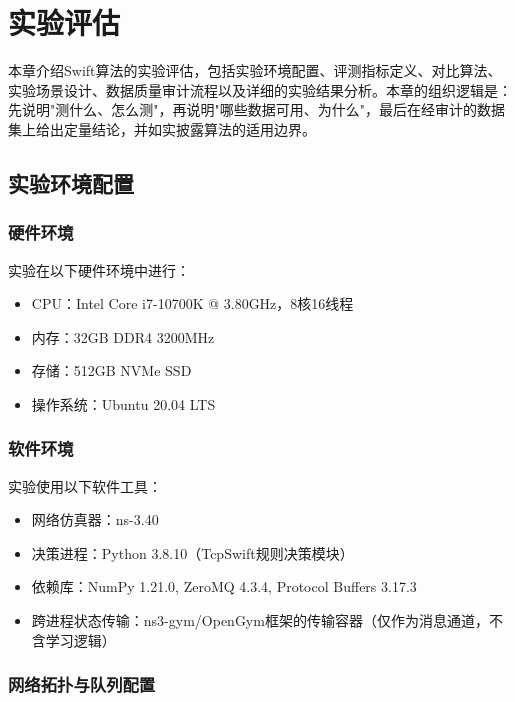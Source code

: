 \chapter{实验评估}\label{Chap:chap4}

本章介绍Swift算法的实验评估，包括实验环境配置、评测指标定义、对比算法、实验场景设计、数据质量审计流程以及详细的实验结果分析。本章的组织逻辑是：先说明"测什么、怎么测"，再说明"哪些数据可用、为什么"，最后在经审计的数据集上给出定量结论，并如实披露算法的适用边界。

\section{实验环境配置}

\subsection{硬件环境}

实验在以下硬件环境中进行：

\begin{itemize}
    \item CPU：Intel Core i7-10700K @ 3.80GHz，8核16线程
    \item 内存：32GB DDR4 3200MHz
    \item 存储：512GB NVMe SSD
    \item 操作系统：Ubuntu 20.04 LTS
\end{itemize}

\subsection{软件环境}

实验使用以下软件工具：

\begin{itemize}
    \item 网络仿真器：ns-3.40
    \item 决策进程：Python 3.8.10（TcpSwift规则决策模块）
    \item 依赖库：NumPy 1.21.0, ZeroMQ 4.3.4, Protocol Buffers 3.17.3
    \item 跨进程状态传输：ns3-gym/OpenGym框架的传输容器（仅作为消息通道，不含学习逻辑）
\end{itemize}

\subsection{网络拓扑与队列配置}
\label{sec:queue-ecn-caveat}

